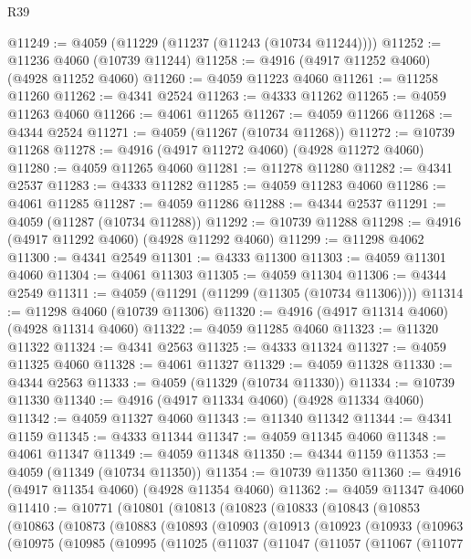 \begin{lexlean}{R39}
\begin{coremodule}
@11249 := @4059 (@11229 (@11237 (@11243 (@10734 @11244))))
@11252 := @11236 @4060 (@10739 @11244)
@11258 := @4916 (@4917 @11252 @4060) (@4928 @11252 @4060)
@11260 := @4059 @11223 @4060
@11261 := @11258 @11260
@11262 := @4341 @2524
@11263 := @4333 @11262
@11265 := @4059 @11263 @4060
@11266 := @4061 @11265
@11267 := @4059 @11266
@11268 := @4344 @2524
@11271 := @4059 (@11267 (@10734 @11268))
@11272 := @10739 @11268
@11278 := @4916 (@4917 @11272 @4060) (@4928 @11272 @4060)
@11280 := @4059 @11265 @4060
@11281 := @11278 @11280
@11282 := @4341 @2537
@11283 := @4333 @11282
@11285 := @4059 @11283 @4060
@11286 := @4061 @11285
@11287 := @4059 @11286
@11288 := @4344 @2537
@11291 := @4059 (@11287 (@10734 @11288))
@11292 := @10739 @11288
@11298 := @4916 (@4917 @11292 @4060) (@4928 @11292 @4060)
@11299 := @11298 @4062
@11300 := @4341 @2549
@11301 := @4333 @11300
@11303 := @4059 @11301 @4060
@11304 := @4061 @11303
@11305 := @4059 @11304
@11306 := @4344 @2549
@11311 := @4059 (@11291 (@11299 (@11305 (@10734 @11306))))
@11314 := @11298 @4060 (@10739 @11306)
@11320 := @4916 (@4917 @11314 @4060) (@4928 @11314 @4060)
@11322 := @4059 @11285 @4060
@11323 := @11320 @11322
@11324 := @4341 @2563
@11325 := @4333 @11324
@11327 := @4059 @11325 @4060
@11328 := @4061 @11327
@11329 := @4059 @11328
@11330 := @4344 @2563
@11333 := @4059 (@11329 (@10734 @11330))
@11334 := @10739 @11330
@11340 := @4916 (@4917 @11334 @4060) (@4928 @11334 @4060)
@11342 := @4059 @11327 @4060
@11343 := @11340 @11342
@11344 := @4341 @1159
@11345 := @4333 @11344
@11347 := @4059 @11345 @4060
@11348 := @4061 @11347
@11349 := @4059 @11348
@11350 := @4344 @1159
@11353 := @4059 (@11349 (@10734 @11350))
@11354 := @10739 @11350
@11360 := @4916 (@4917 @11354 @4060) (@4928 @11354 @4060)
@11362 := @4059 @11347 @4060
@11410 := @10771
    (@10801
      (@10813
        (@10823
          (@10833
            (@10843
              (@10853
                (@10863
                  (@10873
                    (@10883
                      (@10893
                        (@10903
                          (@10913
                            (@10923
                              (@10933
                                (@10963
                                  (@10975
                                    (@10985
                                      (@10995
                                        (@11025
                                          (@11037
                                            (@11047
                                              (@11057
                                                (@11067
                                                  (@11077

\end{coremodule}
\end{lexlean}
